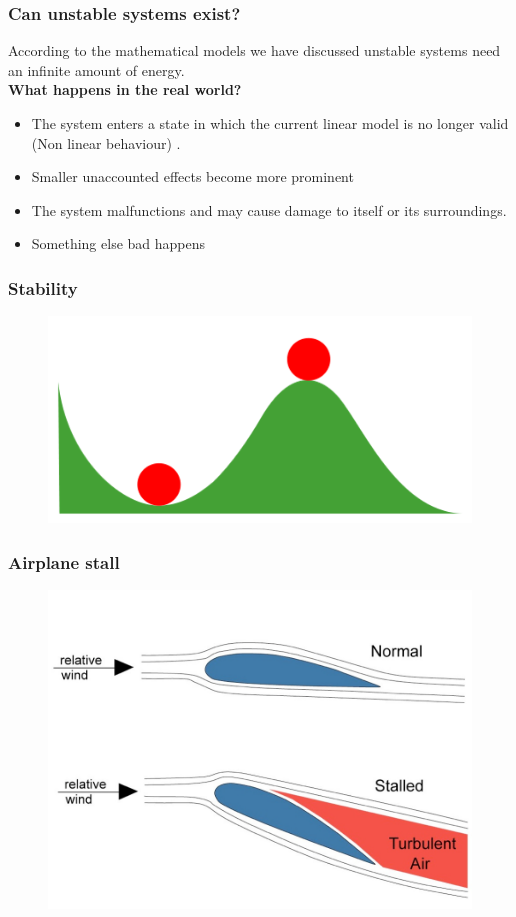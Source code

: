 \begin{frame}
	\frametitle{Can unstable systems exist?}
	According to the mathematical models we have discussed unstable systems need an infinite amount of energy.\\
	\textbf{What happens in the real world?}
	\begin{itemize}
		\item The system enters a state in which the current linear model is no longer valid (Non linear behaviour) .
		\item Smaller unaccounted effects become more prominent
		\item The system malfunctions and may cause damage to itself or its surroundings.
		\item Something else bad happens
	\end{itemize}
\end{frame}
\begin{frame}
	\frametitle{Stability}
	\begin{figure}
	\centering
	\includegraphics[width=0.7\linewidth]{Images/discrete_time_systems_29}
	\label{fig:discrete_time_systems_29}
	\end{figure}

\end{frame}
\begin{frame}
	\frametitle{Airplane stall}
	\begin{figure}
		\centering
		\includegraphics[height=0.7\textheight]{Images/discrete_time_systems_30}
		\label{fig:discrete_time_systems_30}
	\end{figure}
\end{frame}

